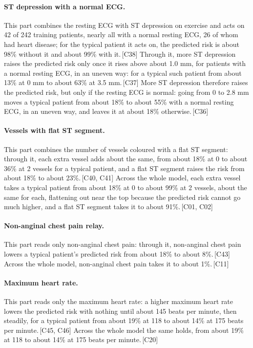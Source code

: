 \documentclass[a4paper,10pt]{article}
\newif\ifreviewmarks
\newcommand{\reviewrule}{\noindent{\color{BrickRed}\rule{\linewidth}{0.8pt}}}
\newenvironment{drafted}[1][]{%
  \ifreviewmarks\par\addvspace{\medskipamount}\reviewrule\par\nopagebreak
  \noindent{\color{BrickRed}\sffamily\footnotesize\textbf{Thesis Draft}\quad #1\hfill review}\par\nopagebreak\smallskip\fi}{%
  \ifreviewmarks\par\smallskip\noindent{\color{BrickRed}\sffamily\footnotesize end of thesis draft}\par\nopagebreak\reviewrule\par\medskip\fi}
\begin{document}
\begin{drafted}[plain-language layer: heart-s1-c1]
\paragraph{ST depression with a normal ECG.} This part combines the resting ECG with ST depression on exercise and acts on 42 of 242 training patients, nearly all with a normal resting ECG, 26 of whom had heart disease; for the typical patient it acts on, the predicted risk is about 98\% without it and about 99\% with it.\,{\scriptsize\textcolor{NavyBlue}{[C38]}} Through it, more ST depression raises the predicted risk only once it rises above about 1.0 mm, for patients with a normal resting ECG, in an uneven way: for a typical such patient from about 13\% at 0 mm to about 63\% at 3.5 mm.\,{\scriptsize\textcolor{NavyBlue}{[C37]}} More ST depression therefore raises the predicted risk, but only if the resting ECG is normal: going from 0 to 2.8 mm moves a typical patient from about 18\% to about 55\% with a normal resting ECG, in an uneven way, and leaves it at about 18\% otherwise.\,{\scriptsize\textcolor{NavyBlue}{[C36]}}
\paragraph{Vessels with flat ST segment.} This part combines the number of vessels coloured with a flat ST segment: through it, each extra vessel adds about the same, from about 18\% at 0 to about 36\% at 2 vessels for a typical patient, and a flat ST segment raises the risk from about 18\% to about 23\%.\,{\scriptsize\textcolor{NavyBlue}{[C40, C41]}} Across the whole model, each extra vessel takes a typical patient from about 18\% at 0 to about 99\% at 2 vessels, about the same for each, flattening out near the top because the predicted risk cannot go much higher, and a flat ST segment takes it to about 91\%.\,{\scriptsize\textcolor{NavyBlue}{[C01, C02]}}
\paragraph{Non-anginal chest pain relay.} This part reads only non-anginal chest pain: through it, non-anginal chest pain lowers a typical patient's predicted risk from about 18\% to about 8\%.\,{\scriptsize\textcolor{NavyBlue}{[C43]}} Across the whole model, non-anginal chest pain takes it to about 1\%.\,{\scriptsize\textcolor{NavyBlue}{[C11]}}
\paragraph{Maximum heart rate.} This part reads only the maximum heart rate: a higher maximum heart rate lowers the predicted risk with nothing until about 145 beats per minute, then steadily, for a typical patient from about 19\% at 118 to about 14\% at 175 beats per minute.\,{\scriptsize\textcolor{NavyBlue}{[C45, C46]}} Across the whole model the same holds, from about 19\% at 118 to about 14\% at 175 beats per minute.\,{\scriptsize\textcolor{NavyBlue}{[C20]}}

\end{drafted}
\end{document}
